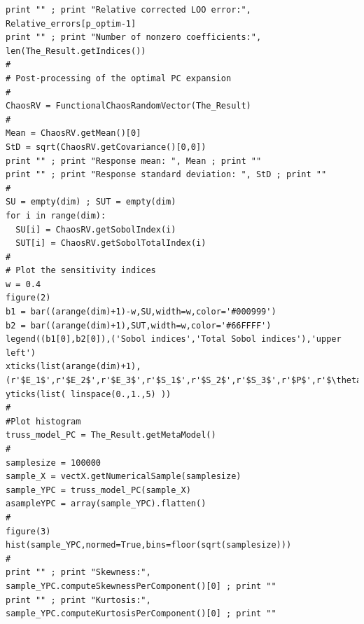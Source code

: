\documentclass[11pt]{article}
\begin{document}
\begin{lstlisting}
print "" ; print "Relative corrected LOO error:", Relative_errors[p_optim-1]
print "" ; print "Number of nonzero coefficients:", len(The_Result.getIndices()) 
#
# Post-processing of the optimal PC expansion
#
ChaosRV = FunctionalChaosRandomVector(The_Result)
#
Mean = ChaosRV.getMean()[0]
StD = sqrt(ChaosRV.getCovariance()[0,0])
print "" ; print "Response mean: ", Mean ; print ""
print "" ; print "Response standard deviation: ", StD ; print ""
#
SU = empty(dim) ; SUT = empty(dim)
for i in range(dim):
  SU[i] = ChaosRV.getSobolIndex(i)
  SUT[i] = ChaosRV.getSobolTotalIndex(i)
#
# Plot the sensitivity indices
w = 0.4
figure(2)
b1 = bar((arange(dim)+1)-w,SU,width=w,color='#000999')
b2 = bar((arange(dim)+1),SUT,width=w,color='#66FFFF')
legend((b1[0],b2[0]),('Sobol indices','Total Sobol indices'),'upper left')
xticks(list(arange(dim)+1),(r'$E_1$',r'$E_2$',r'$E_3$',r'$S_1$',r'$S_2$',r'$S_3$',r'$P$',r'$\theta$',r'$\alpha_1$',r'$\alpha_2$'),size=18)
yticks(list( linspace(0.,1.,5) ))
#
#Plot histogram
truss_model_PC = The_Result.getMetaModel()
#
samplesize = 100000
sample_X = vectX.getNumericalSample(samplesize)
sample_YPC = truss_model_PC(sample_X)
asampleYPC = array(sample_YPC).flatten()
#
figure(3)
hist(sample_YPC,normed=True,bins=floor(sqrt(samplesize)))
#
print "" ; print "Skewness:",  sample_YPC.computeSkewnessPerComponent()[0] ; print ""
print "" ; print "Kurtosis:",  sample_YPC.computeKurtosisPerComponent()[0] ; print ""
\end{lstlisting}
\end{document}
